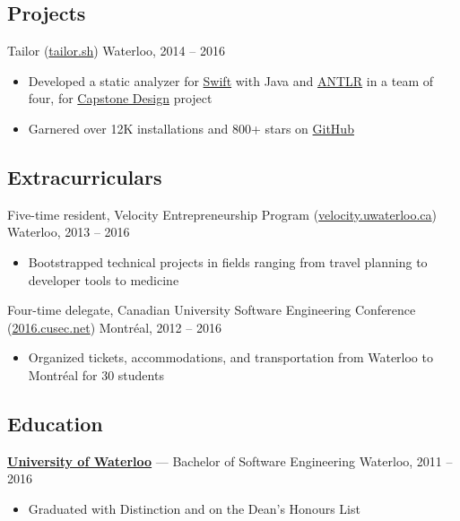 \documentclass[pdftex,11pt,letterpaper]{article}
\begin{document}
\subsection*{Projects}

Tailor (\href{https://tailor.sh}{tailor.sh}) \hfill {\color{gray} Waterloo, 2014 -- 2016}
\begin{itemize}
    \item Developed a static analyzer for \href{https://swift.org}{Swift} with Java and \href{http://antlr.org}{ANTLR} in a team of four, for \href{https://uwaterloo.ca/capstone-design/}{Capstone Design} project
    \item Garnered over 12K installations and 800+ stars on \href{https://github.com/sleekbyte/tailor}{GitHub}
\end{itemize}

\subsection*{Extracurriculars}

Five-time resident, Velocity Entrepreneurship Program (\href{http://velocity.uwaterloo.ca}{velocity.uwaterloo.ca}) \hfill {\color{gray} Waterloo, 2013 -- 2016}
\begin{itemize}
  \item Bootstrapped technical projects in fields ranging from travel planning to developer tools to medicine
\end{itemize}

Four-time delegate, Canadian University Software Engineering Conference (\href{http://2016.cusec.net}{2016.cusec.net}) \hfill {\color{gray} Montr\'{e}al, 2012 -- 2016}
\begin{itemize}
  \item Organized tickets, accommodations, and transportation from Waterloo to Montr\'{e}al for 30 students
\end{itemize}

\subsection*{Education}

\href{https://uwaterloo.ca}{\textbf{University of Waterloo}} --- Bachelor of Software Engineering \hfill {\color{gray} Waterloo, 2011 -- 2016}
\begin{itemize}
  \item Graduated with Distinction and on the Dean's Honours List
\end{itemize}
\end{document}
